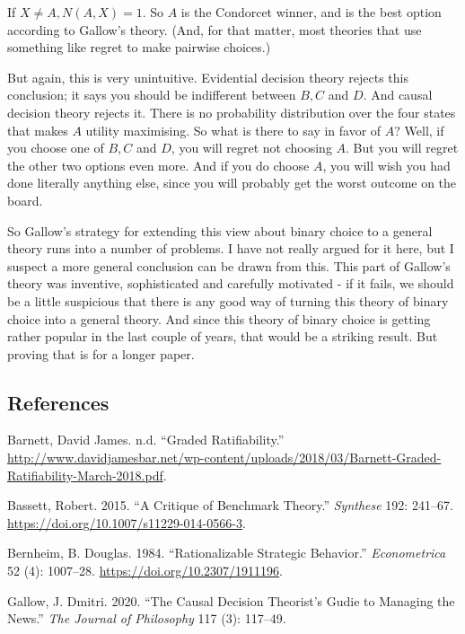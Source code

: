\documentclass[
  12pt,
]{article}
\begin{document}
If \(X \neq A, N(A, X) = 1\). So \(A\) is the Condorcet winner, and is
the best option according to Gallow's theory. (And, for that matter,
most theories that use something like regret to make pairwise choices.)

But again, this is very unintuitive. Evidential decision theory rejects
this conclusion; it says you should be indifferent between \(B, C\) and
\(D\). And causal decision theory rejects it. There is no probability
distribution over the four states that makes \(A\) utility maximising.
So what is there to say in favor of \(A\)? Well, if you choose one of
\(B, C\) and \(D\), you will regret not choosing \(A\). But you will
regret the other two options even more. And if you do choose \(A\), you
will wish you had done literally anything else, since you will probably
get the worst outcome on the board.

So Gallow's strategy for extending this view about binary choice to a
general theory runs into a number of problems. I have not really argued
for it here, but I suspect a more general conclusion can be drawn from
this. This part of Gallow's theory was inventive, sophisticated and
carefully motivated - if it fails, we should be a little suspicious that
there is any good way of turning this theory of binary choice into a
general theory. And since this theory of binary choice is getting rather
popular in the last couple of years, that would be a striking result.
But proving that is for a longer paper.

\hypertarget{references}{%
\subsection*{References}\label{references}}

\hypertarget{refs}{}
\leavevmode\hypertarget{ref-Barnettnd}{}%
Barnett, David James. n.d. ``Graded Ratifiability.''
\url{http://www.davidjamesbar.net/wp-content/uploads/2018/03/Barnett-Graded-Ratifiability-March-2018.pdf}.

\leavevmode\hypertarget{ref-Bassett2015}{}%
Bassett, Robert. 2015. ``A Critique of Benchmark Theory.''
\emph{Synthese} 192: 241--67.
\url{https://doi.org/10.1007/s11229-014-0566-3}.

\leavevmode\hypertarget{ref-Bernheim1984}{}%
Bernheim, B. Douglas. 1984. ``Rationalizable Strategic Behavior.''
\emph{Econometrica} 52 (4): 1007--28.
\url{https://doi.org/10.2307/1911196}.

\leavevmode\hypertarget{ref-Gallow2020}{}%
Gallow, J. Dmitri. 2020. ``The Causal Decision Theorist's Gudie to
Managing the News.'' \emph{The Journal of Philosophy} 117 (3): 117--49.
\end{document}
